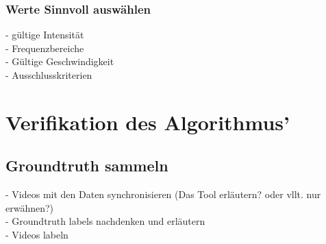 \subsubsection{Werte Sinnvoll auswählen}
- gültige Intensität\\
- Frequenzbereiche\\
- Gültige Geschwindigkeit\\
- Ausschlusskriterien\\





\section{Verifikation des Algorithmus'}
%
%
%


\subsection{Groundtruth sammeln}

- Videos mit den Daten synchronisieren (Das Tool erläutern? oder vllt. nur erwähnen?)\\
- Groundtruth labels nachdenken und erläutern\\
- Videos labeln\\
















